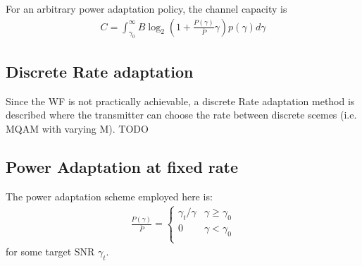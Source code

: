 \documentclass[12pt]{report} %
\begin{document}
For an arbitrary power adaptation policy, the channel capacity is
\begin{align}
  C = \int_{\gamma_0}^{\infty} B \log_{2} (1 + \frac{P(\gamma)}{\overline{P}}\gamma)p(\gamma)d\gamma
\end{align}

\subsection*{Discrete Rate adaptation}
Since the \gls{WF} is not practically achievable, a discrete Rate adaptation method is described where the transmitter can choose the rate between discrete scemes (i.e. MQAM with varying M).
TODO
\subsection*{Power Adaptation at fixed rate}
The power adaptation scheme employed here is:
\begin{align} \label{PA_policy_fixedR}
  \frac{P(\gamma)}{\overline{P}} = \left\{ \begin{array}{ll}
                                             \gamma_t/\gamma & \gamma \geq \gamma_0 \\
                                             0               & \gamma < \gamma_0    \\
                                           \end{array}
  \right.
\end{align}
for some target \gls{SNR} $\gamma_t$.
\printglossary[type=\acronymtype,title=Acronyms]



\end{document}
